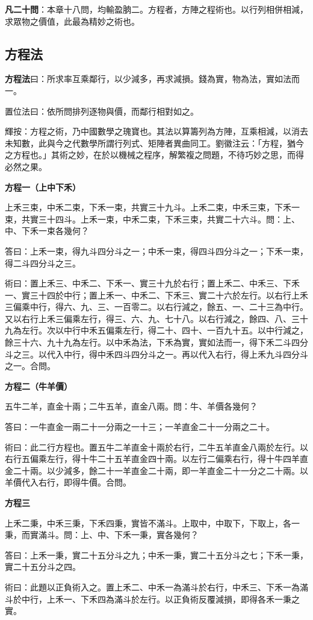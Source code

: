 \documentclass[11pt,a4paper]{article}
\newenvironment{problemenv}[1]{%
  \medskip\noindent\textbf{#1}\par\nopagebreak\smallskip
}{\medskip}
\begin{document}
\textbf{凡二十問}：本章十八問，均輸盈朒二。方程者，方陣之程術也。以行列相併相減，求眾物之價值，此最為精妙之術也。

\subsection{方程法}

\textbf{方程法}曰：所求率互乘鄰行，以少減多，再求減損。錢為實，物為法，實如法而一。

置位法曰：依所問排列逐物與價，而鄰行相對如之。

輝按：方程之術，乃中國數學之瑰寶也。其法以算籌列為方陣，互乘相減，以消去未知數，此與今之代數學所謂行列式、矩陣者異曲同工。劉徽注云：「方程，猶今之方程也。」其術之妙，在於以機械之程序，解繁複之問題，不待巧妙之思，而得必然之果。

\begin{problemenv}{方程一（上中下禾）}
上禾三束，中禾二束，下禾一束，共實三十九斗。上禾二束，中禾三束，下禾一束，共實三十四斗。上禾一束，中禾二束，下禾三束，共實二十六斗。問：上、中、下禾一束各幾何？

\textsf{答曰：}上禾一束，得九斗四分斗之一；中禾一束，得四斗四分斗之一；下禾一束，得二斗四分斗之三。

\textsf{術曰：}置上禾三、中禾二、下禾一、實三十九於右行；置上禾二、中禾三、下禾一、實三十四於中行；置上禾一、中禾二、下禾三、實二十六於左行。以右行上禾三偏乘中行，得六、九、三、一百零二。以右行減之，餘五、一、二十三為中行。又以右行上禾三偏乘左行，得三、六、九、七十八。以右行減之，餘四、八、三十九為左行。次以中行中禾五偏乘左行，得二十、四十、一百九十五。以中行減之，餘三十六、九十九為左行。以中禾為法，下禾為實，實如法而一，得下禾二斗四分斗之三。以代入中行，得中禾四斗四分斗之一。再以代入右行，得上禾九斗四分斗之一。合問。
\end{problemenv}

\begin{problemenv}{方程二（牛羊價）}
五牛二羊，直金十兩；二牛五羊，直金八兩。問：牛、羊價各幾何？

\textsf{答曰：}一牛直金一兩二十一分兩之一十三；一羊直金二十一分兩之二十。

\textsf{術曰：}此二行方程也。置五牛二羊直金十兩於右行，二牛五羊直金八兩於左行。以右行五偏乘左行，得十牛二十五羊直金四十兩。以左行二偏乘右行，得十牛四羊直金二十兩。以少減多，餘二十一羊直金二十兩，即一羊直金二十一分之二十兩。以羊價代入右行，即得牛價。合問。
\end{problemenv}

\begin{problemenv}{方程三}
上禾二秉，中禾三秉，下禾四秉，實皆不滿斗。上取中，中取下，下取上，各一秉，而實滿斗。問：上、中、下禾一秉，實各幾何？

\textsf{答曰：}上禾一秉，實二十五分斗之九；中禾一秉，實二十五分斗之七；下禾一秉，實二十五分斗之四。

\textsf{術曰：}此題以正負術入之。置上禾二、中禾一為滿斗於右行，中禾三、下禾一為滿斗於中行，上禾一、下禾四為滿斗於左行。以正負術反覆減損，即得各禾一秉之實。
\end{problemenv}
\end{document}
